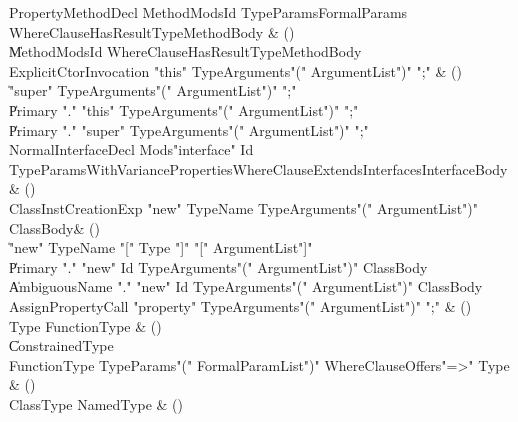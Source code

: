 \begin{bbgrammar}
 PropertyMethodDecl  \label{prod:PropertyMethodDecl}  \: MethodMods\opt Id TypeParams\opt FormalParams WhereClause\opt HasResultType\opt MethodBody & ()\\
    \| MethodMods\opt Id WhereClause\opt HasResultType\opt MethodBody\\
 ExplicitCtorInvocation  \label{prod:ExplicitCtorInvocation}  \: \xcd"this" TypeArguments\opt \xcd"(" ArgumentList\opt \xcd")" \xcd";" & ()\\
    \| \xcd"super" TypeArguments\opt \xcd"(" ArgumentList\opt \xcd")" \xcd";"\\
    \| Primary \xcd"." \xcd"this" TypeArguments\opt \xcd"(" ArgumentList\opt \xcd")" \xcd";"\\
    \| Primary \xcd"." \xcd"super" TypeArguments\opt \xcd"(" ArgumentList\opt \xcd")" \xcd";"\\
 NormalInterfaceDecl  \label{prod:NormalInterfaceDecl}  \: Mods\opt \xcd"interface" Id TypeParamsWithVariance\opt Properties\opt WhereClause\opt ExtendsInterfaces\opt InterfaceBody & ()\\
 ClassInstCreationExp  \label{prod:ClassInstCreationExp}  \: \xcd"new" TypeName TypeArguments\opt \xcd"(" ArgumentList\opt \xcd")" ClassBody\opt & ()\\
    \| \xcd"new" TypeName \xcd"[" Type \xcd"]" \xcd"[" ArgumentList\opt \xcd"]"\\
    \| Primary \xcd"." \xcd"new" Id TypeArguments\opt \xcd"(" ArgumentList\opt \xcd")" ClassBody\opt\\
    \| AmbiguousName \xcd"." \xcd"new" Id TypeArguments\opt \xcd"(" ArgumentList\opt \xcd")" ClassBody\opt\\
 AssignPropertyCall  \label{prod:AssignPropertyCall}  \: \xcd"property" TypeArguments\opt \xcd"(" ArgumentList\opt \xcd")" \xcd";" & ()\\
 Type  \label{prod:Type}  \: FunctionType & ()\\
    \| ConstrainedType\\
 FunctionType  \label{prod:FunctionType}  \: TypeParams\opt \xcd"(" FormalParamList\opt \xcd")" WhereClause\opt Offers\opt \xcd"=>" Type & ()\\
 ClassType  \label{prod:ClassType}  \: NamedType & ()\\

\end{bbgrammar}

